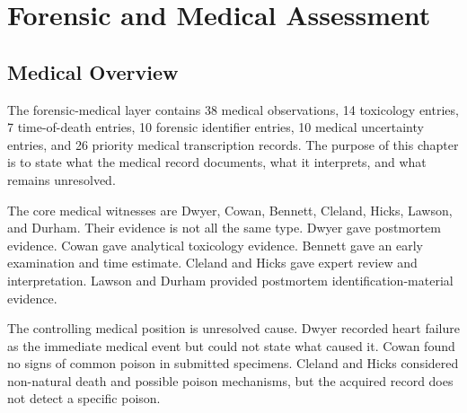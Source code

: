 \chapter{Forensic and Medical Assessment}
\label{chap:forensic-and-medical-assessment}


\section{Medical Overview}

The forensic-medical layer contains 38 medical observations, 14 toxicology entries, 7 time-of-death entries, 10 forensic identifier entries, 10 medical uncertainty entries, and 26 priority medical transcription records. The purpose of this chapter is to state what the medical record documents, what it interprets, and what remains unresolved.

The core medical witnesses are Dwyer, Cowan, Bennett, Cleland, Hicks, Lawson, and Durham. Their evidence is not all the same type. Dwyer gave postmortem evidence. Cowan gave analytical toxicology evidence. Bennett gave an early examination and time estimate. Cleland and Hicks gave expert review and interpretation. Lawson and Durham provided postmortem identification-material evidence.

The controlling medical position is unresolved cause. Dwyer recorded heart failure as the immediate medical event but could not state what caused it. Cowan found no signs of common poison in submitted specimens. Cleland and Hicks considered non-natural death and possible poison mechanisms, but the acquired record does not detect a specific poison.

